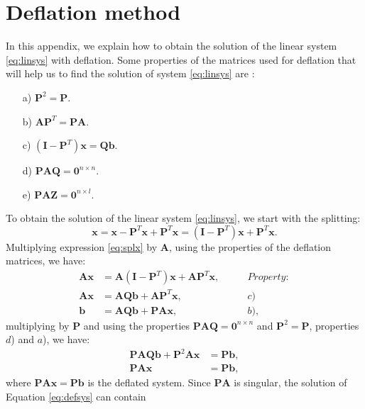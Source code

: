 \documentclass[review]{elsarticle}
\begin{document}
\section{Deflation method}\label{a4}
In this appendix, we explain how to obtain the solution of the linear system \eqref{eq:linsys} with deflation.
Some properties of the matrices used for deflation that will help us to find the solution of system \eqref{eq:linsys} are \cite{Tang09}:
\begin{enumerate}\label{defprop}
 \item[a)] $\mathbf{P}^2=\mathbf{P}.$
 \item[b)] $\mathbf{A}\mathbf{P}^T=\mathbf{P}\mathbf{A}.$
 \item[c)] $(\mathbf{I}-\mathbf{P}^T)\mathbf{x}=\mathbf{Q}\mathbf{b}.$
 \item[d)]$\mathbf{P}\mathbf{A}\mathbf{Q}=\mathbf{0}^{n\times n}.$
  \item[e)]$\mathbf{P}\mathbf{A}\mathbf{Z}=\mathbf{0}^{n\times l}.$
\end{enumerate}
To obtain the solution of the linear system \eqref{eq:linsys}, we start with the splitting:
\begin{equation}\label{eq:splx}
    \mathbf{x}=\mathbf{x}-\mathbf{P}^T\mathbf{x}+\mathbf{P}^T\mathbf{x}=(\mathbf{I}-\mathbf{P}^T)\mathbf{x}+\mathbf{P}^T\mathbf{x}.
\end{equation}
Multiplying expression \eqref{eq:splx} by $\mathbf{A}$, using the properties of the deflation matrices, we have:
\begin{align*}
\mathbf{A}\mathbf{x}&=\mathbf{A}(\mathbf{I}-\mathbf{P}^T)\mathbf{x}+\mathbf{A}\mathbf{P}^T\mathbf{x},\qquad&Property:\\
\mathbf{A}\mathbf{x}&=\mathbf{A}\mathbf{Q}\mathbf{b}+\mathbf{A}\mathbf{P}^T\mathbf{x},&c)\\
\mathbf{b}&=\mathbf{A}\mathbf{Q}\mathbf{b}+\mathbf{P}\mathbf{A}\mathbf{x},&b),
\end{align*}
multiplying by $\mathbf{P}$ and using the properties $\mathbf{P}\mathbf{A}\mathbf{Q}=
\mathbf{0}^{n\times n}$ and $\mathbf{P}^2=\mathbf{P}$, properties $d$) and $a$), we have:
\begin{align*}
\mathbf{P}\mathbf{A}\mathbf{Q}\mathbf{b}+\mathbf{P}^2\mathbf{A}\mathbf{x}&=\mathbf{P}\mathbf{b},\nonumber \\
\mathbf{P}\mathbf{A}\mathbf{x}&=\mathbf{P}\mathbf{b},
\end{align*}
where $\mathbf{P}\mathbf{A}\mathbf{x}=\mathbf{P}\mathbf{b}$ is the deflated system. Since 
$\mathbf{P}\mathbf{A}$ is singular, the solution of Equation \eqref{eq:defsys} can contain
\end{document}
